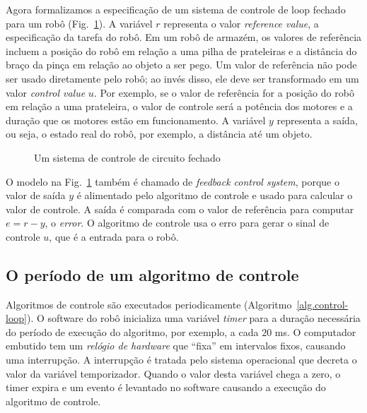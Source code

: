 Agora formalizamos a especificação de um sistema de controle de loop fechado para um robô (Fig.~\ref{fig.control-model}). A variável $r$ representa o valor \emph{reference value}, a especificação da tarefa do robô. Em um robô de armazém, os valores de referência incluem a posição do robô em relação a uma pilha de prateleiras e a distância do braço da pinça em relação ao objeto a ser pego. Um valor de referência não pode ser usado diretamente pelo robô; ao invés disso, ele deve ser transformado em um valor \emph{control value} $u$. Por exemplo, se o valor de referência for a posição do robô em relação a uma prateleira, o valor de controle será a potência dos motores e a duração que os motores estão em funcionamento. A variável $y$ representa a saída, ou seja, o estado real do robô, por exemplo, a distância até um objeto.

\begin{figure}
\begin{center}
\caption{Um sistema de controle de circuito fechado}\label{fig.control-model}
\end{center}
\end{figure}

O modelo na Fig.~\ref{fig.control-model} também é chamado de \emph{feedback control system}, porque o valor de saída $y$ é alimentado pelo algoritmo de controle e usado para calcular o valor de controle. A saída é comparada com o valor de referência para computar $e=r-y$, o \emph{error}. O algoritmo de controle usa o erro para gerar o sinal de controle $u$, que é a entrada para o robô.

\subsection{O período de um algoritmo de controle}

Algoritmos de controle são executados periodicamente (Algoritmo~\ref{alg.control-loop}). O software do robô inicializa uma variável \emph{timer} para a duração necessária do período de execução do algoritmo, por exemplo, a cada $20$ ms. O computador embutido tem um \emph{relógio de hardware} que ``fixa'' em intervalos fixos, causando uma interrupção. A interrupção é tratada pelo sistema operacional que decreta o valor da variável temporizador. Quando o valor desta variável chega a zero, o timer expira e um evento é levantado no software causando a execução do algoritmo de controle.

